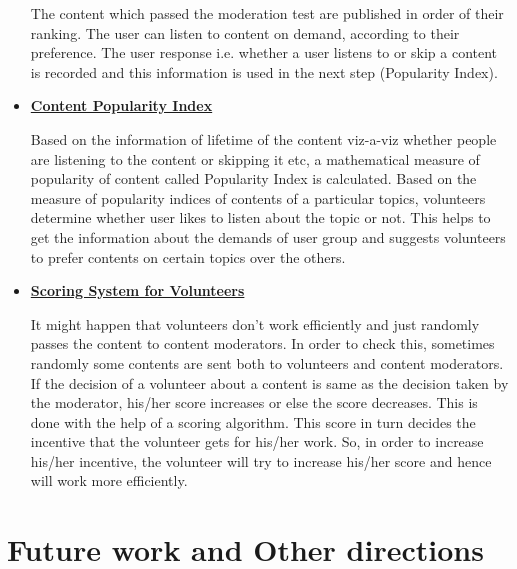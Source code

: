 \documentclass[11pt]{article}
\begin{document}
\begin{itemize}
			The content which passed the moderation test are published in order of their ranking. The user can listen to content on demand, according to their preference. The user response i.e. whether a user listens to or skip a content is recorded and this information is used in the next step (Popularity Index).

\bigskip
			\item \textbf{\underline{Content Popularity Index}}


			Based on the information of lifetime of the content viz-a-viz whether people are listening to the content or skipping it etc, a mathematical measure of popularity of content called Popularity Index is calculated. Based on the measure of popularity indices of contents of a particular topics, volunteers determine whether user likes to listen about the topic or not. This helps to get the information about the demands of user group and suggests volunteers to prefer contents on certain topics over the others.


			\item \textbf{\underline{Scoring System for Volunteers}}


			It might happen that volunteers don't work efficiently and just randomly passes the content to content moderators. In order to check this, sometimes randomly some contents are sent both to volunteers and content moderators. If the decision of a volunteer about a content is same as the decision taken by the moderator, his/her score increases or else the score decreases. This is done with the help of a scoring algorithm. This score in turn decides the incentive that the volunteer gets for his/her work. So, in order to increase his/her incentive, the volunteer will try to increase his/her score and hence will work more efficiently.


		\end{itemize}

	\section{Future work and Other directions}	
\end{document}
